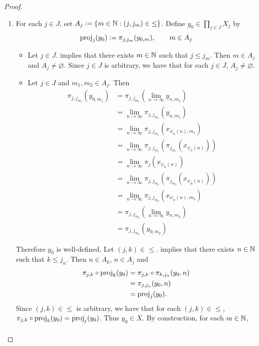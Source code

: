 \documentclass{book}
\begin{document}
\begin{proof}
\begin{enumerate}
\begin{enumerate}
			\item For each $j \in J$, set $A_j \vcentcolon= \{m \in \mathbb{N}: (j, j_m) \in {\leq}\}$. Define $y_0 \in \prod\limits_{j \in J} X_j$ by 
			$$\operatorname{\text{proj}}_j(y_0) \vcentcolon= \pi_{j,j_m}(y_{0, m}), \quad \quad m \in A_j$$ 
			\begin{itemize} 
				\item Let $j \in J$.  implies that there exists $m \in \mathbb{N}$ such that $j \leq j_m$. Then $m \in A_j$ and $A_j \neq \varnothing$. Since $j \in J$ is arbitrary, we have that for each $j \in J$, $A_j \neq \varnothing$.
				\item  Let $j \in J$ and $m_1, m_2 \in A_j$. Then 
				\begin{align*}
					\pi_{j,j_{m_1}}(y_{0,m_1})
					& = \pi_{j, j_{m_1}}(\lim\limits_{n \rightarrow \infty} y_{n,m_1}) \\
					& = \lim\limits_{n \rightarrow \infty} \pi_{j, j_{m_1}}( y_{n,m_1}) \\
					& = \lim\limits_{n \rightarrow \infty} \pi_{j, j_{m_1}}(x_{\psi_n(n),m_1}) \\
					& = \lim\limits_{n \rightarrow \infty} \pi_{j, j_{m_1}}(\pi_{j_{m_1}}(x_{\psi_n(n)})) \\
					& = \lim\limits_{n \rightarrow \infty} \pi_j(x_{\psi_n(n)}) \\
					& = \lim\limits_{n \rightarrow \infty} \pi_{j, j_{m_2}}(\pi_{j_{m_2}}(x_{\psi_n(n)})) \\
					& = \lim\limits_{n \rightarrow \infty} \pi_{j, j_{m_2}}(x_{\psi_n(n),m_2}) \\
					& = \pi_{j, j_{m_2}}(\lim\limits_{n \rightarrow \infty} y_{n,m_2}) \\
					& = \pi_{j,j_{m_2}}(y_{0,m_2})
				\end{align*}
			\end{itemize}
			Therefore $y_0$ is well-defined. Let $(j,k) \in {\leq}$.  implies that there exists $n \in \mathbb{N}$ such that $k \leq j_n$. Then $n \in A_k$, $n \in A_j$ and 
			\begin{align*}
				\pi_{j,k} \circ \operatorname{\text{proj}}_k(y_0)
				& = \pi_{j,k} \circ  \pi_{k, j_n}(y_0,n) \\
				& = \pi_{j, j_n}(y_0, n) \\
				& = \operatorname{\text{proj}}_j(y_0).
			\end{align*}
			Since $(j,k) \in {\leq}$ is arbitrary, we have that for each $(j,k) \in {\leq}$, $\pi_{j,k} \circ \operatorname{\text{proj}}_k(y_0) = \operatorname{\text{proj}}_j(y_0)$. Thus $y_0 \in X$. By construction, for each $m \in \mathbb{N}$, 
			\begin{align*}

\end{align*}
\end{enumerate}
\end{enumerate}
\end{proof}
\end{document}

